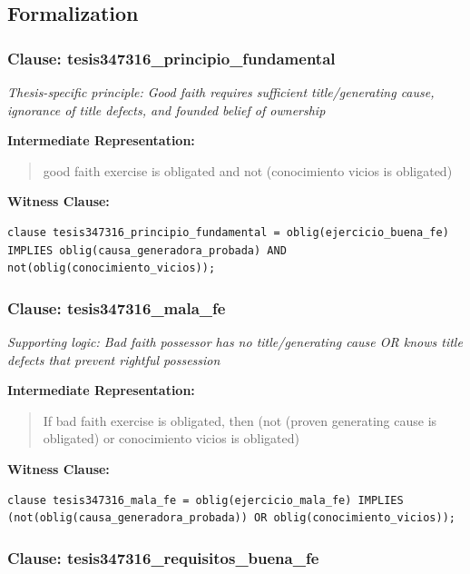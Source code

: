 \documentclass[11pt,a4paper]{article}
\begin{document}
\subsection{Formalization}

\subsubsection{Clause: tesis347316\_principio\_fundamental}

\textit{Thesis-specific principle: Good faith requires sufficient title/generating cause, ignorance of title defects, and founded belief of ownership}

\textbf{Intermediate Representation:}

\begin{quote}
good faith exercise is obligated and not (conocimiento vicios is obligated)
\end{quote}

\textbf{Witness Clause:}

\begin{lstlisting}[style=witnessstyle, language=Witness]
clause tesis347316_principio_fundamental = oblig(ejercicio_buena_fe) IMPLIES oblig(causa_generadora_probada) AND not(oblig(conocimiento_vicios));
\end{lstlisting}

\subsubsection{Clause: tesis347316\_mala\_fe}

\textit{Supporting logic: Bad faith possessor has no title/generating cause OR knows title defects that prevent rightful possession}

\textbf{Intermediate Representation:}

\begin{quote}
If bad faith exercise is obligated, then (not (proven generating cause is obligated) or conocimiento vicios is obligated)
\end{quote}

\textbf{Witness Clause:}

\begin{lstlisting}[style=witnessstyle, language=Witness]
clause tesis347316_mala_fe = oblig(ejercicio_mala_fe) IMPLIES (not(oblig(causa_generadora_probada)) OR oblig(conocimiento_vicios));
\end{lstlisting}

\subsubsection{Clause: tesis347316\_requisitos\_buena\_fe}
\end{document}
